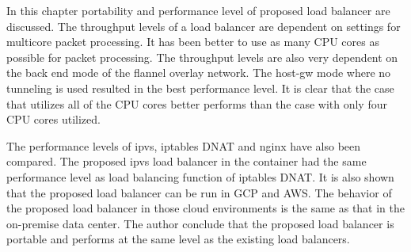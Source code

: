 In this chapter portability and performance level of proposed load balancer are discussed.
The throughput levels of a load balancer are dependent on settings for multicore packet processing.
It has been better to use as many CPU cores as possible for packet processing.
The throughput levels are also very dependent on the back end mode of the flannel overlay network.
The host-gw mode where no tunneling is used resulted in the best performance level.
It is clear that the case that utilizes all of the CPU cores better performs than the case with only four CPU cores utilized.

The performance levels of ipvs, iptables DNAT and nginx have also been compared.
The proposed ipvs load balancer in the container had the same performance level as load balancing function of iptables DNAT.
It is also shown that the proposed load balancer can be run in GCP and AWS.
The behavior of the proposed load balancer in those cloud environments is the same as that in the on-premise data center.
The author conclude that the proposed load balancer is portable and performs at the same level as the existing load balancers.

